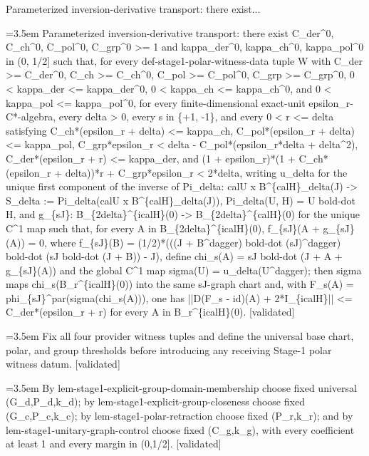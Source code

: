 \documentclass{article}
\newcommand{\step}[1]{\par\noindent\hangindent=3.5em\hangafter=1%
  \makebox[3.5em][l]{\textbf{#1.}}}
\newcommand{\steptag}[1]{\hfill{\small\textsf{[#1]}}}
\begin{document}
\begin{proofbox}{Parameterized inversion-derivative transport: there exist...}
\step{1} Parameterized inversion-derivative transport: there exist C\_der\textasciicircum{}0, C\_ch\textasciicircum{}0, C\_pol\textasciicircum{}0, C\_grp\textasciicircum{}0 >= 1 and kappa\_der\textasciicircum{}0, kappa\_ch\textasciicircum{}0, kappa\_pol\textasciicircum{}0 in (0, 1/2] such that, for every def-stage1-polar-witness-data tuple W with C\_der >= C\_der\textasciicircum{}0, C\_ch >= C\_ch\textasciicircum{}0, C\_pol >= C\_pol\textasciicircum{}0, C\_grp >= C\_grp\textasciicircum{}0, 0 < kappa\_der <= kappa\_der\textasciicircum{}0, 0 < kappa\_ch <= kappa\_ch\textasciicircum{}0, and 0 < kappa\_pol <= kappa\_pol\textasciicircum{}0, for every finite-dimensional exact-unit epsilon\_r-C*-algebra, every delta > 0, every s in \{+1, -1\}, and every 0 < r <= delta satisfying C\_ch*(epsilon\_r + delta) <= kappa\_ch, C\_pol*(epsilon\_r + delta) <= kappa\_pol, C\_grp*epsilon\_r < delta - C\_pol*(epsilon\_r*delta + delta\textasciicircum{}2), C\_der*(epsilon\_r + r) <= kappa\_der, and (1 + epsilon\_r)*(1 + C\_ch*(epsilon\_r + delta))*r + C\_grp*epsilon\_r < 2*delta, writing u\_delta for the unique first component of the inverse of Pi\_delta: calU x B\textasciicircum{}\{calH\}\_delta(J) -> S\_delta := Pi\_delta(calU x B\textasciicircum{}\{calH\}\_delta(J)), Pi\_delta(U, H) = U bold-dot H, and g\_\{sJ\}: B\_\{2delta\}\textasciicircum{}\{icalH\}(0) -> B\_\{2delta\}\textasciicircum{}\{calH\}(0) for the unique C\textasciicircum{}1 map such that, for every A in B\_\{2delta\}\textasciicircum{}\{icalH\}(0), f\_\{sJ\}(A + g\_\{sJ\}(A)) = 0, where f\_\{sJ\}(B) = (1/2)*(((J + B\textasciicircum{}dagger) bold-dot (sJ)\textasciicircum{}dagger) bold-dot (sJ bold-dot (J + B)) - J), define chi\_s(A) = sJ bold-dot (J + A + g\_\{sJ\}(A)) and the global C\textasciicircum{}1 map sigma(U) = u\_delta(U\textasciicircum{}dagger); then sigma maps chi\_s(B\_r\textasciicircum{}\{icalH\}(0)) into the same sJ-graph chart and, with F\_s(A) = phi\_\{sJ\}\textasciicircum{}par(sigma(chi\_s(A))), one has ||D(F\_s - id)(A) + 2*I\_\{icalH\}|| <= C\_der*(epsilon\_r + r) for every A in B\_r\textasciicircum{}\{icalH\}(0). \steptag{validated} \\[6pt]
\step{1.1} Fix all four provider witness tuples and define the universal base chart, polar, and group thresholds before introducing any receiving Stage-1 polar witness datum. \steptag{validated} \\[6pt]
\step{1.1.1} By lem-stage1-explicit-group-domain-membership choose fixed universal (G\_d,P\_d,k\_d); by lem-stage1-explicit-group-closeness choose fixed (G\_c,P\_c,k\_c); by lem-stage1-polar-retraction choose fixed (P\_r,k\_r); and by lem-stage1-unitary-graph-control choose fixed (C\_g,k\_g), with every coefficient at least 1 and every margin in (0,1/2]. \steptag{validated} \\[4pt]

\end{proofbox}
\end{document}
